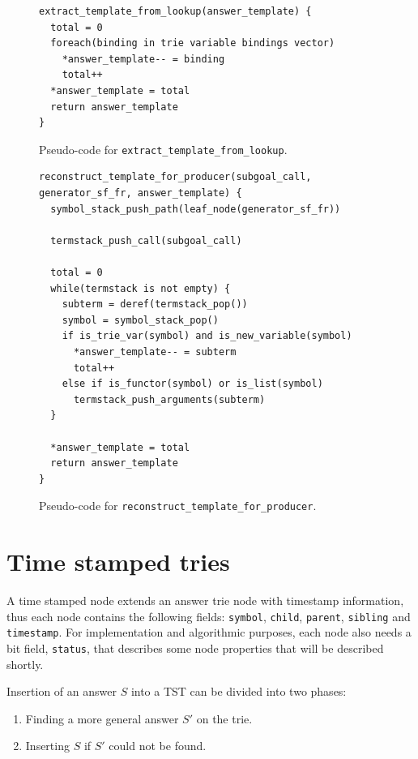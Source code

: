 \begin{figure}[ht]
\begin{Verbatim}[fontsize=\small]
extract_template_from_lookup(answer_template) {
  total = 0
  foreach(binding in trie variable bindings vector)
    *answer_template-- = binding
    total++
  *answer_template = total
  return answer_template
}
\end{Verbatim}
\caption{Pseudo-code for \texttt{extract\_template\_from\_lookup}.}
\label{fig:extract_template_from_lookup}
\end{figure}

\begin{figure}[ht]
\begin{Verbatim}[fontsize=\small]
reconstruct_template_for_producer(subgoal_call, generator_sf_fr, answer_template) {
  symbol_stack_push_path(leaf_node(generator_sf_fr))
  
  termstack_push_call(subgoal_call)
  
  total = 0
  while(termstack is not empty) {
    subterm = deref(termstack_pop())
    symbol = symbol_stack_pop()
    if is_trie_var(symbol) and is_new_variable(symbol)
      *answer_template-- = subterm
      total++
    else if is_functor(symbol) or is_list(symbol)
      termstack_push_arguments(subterm)
  }
  
  *answer_template = total
  return answer_template
}
\end{Verbatim}
\caption{Pseudo-code for \texttt{reconstruct\_template\_for\_producer}.}
\label{fig:reconstruct_template_for_producer}
\end{figure}

\section{Time stamped tries}

A time stamped node extends an answer trie node with timestamp information, thus
each node contains the following fields: \texttt{symbol}, \texttt{child}, \texttt{parent}, \texttt{sibling}
and \texttt{timestamp}. For implementation and algorithmic purposes, each node also needs a bit field,
\texttt{status}, that describes some node properties that will be described shortly.

Insertion of an answer $S$ into a TST can be divided into two phases:

\begin{enumerate}
  \item Finding a more general answer $S'$ on the trie.
  \item Inserting $S$ if $S'$ could not be found.
\end{enumerate}

